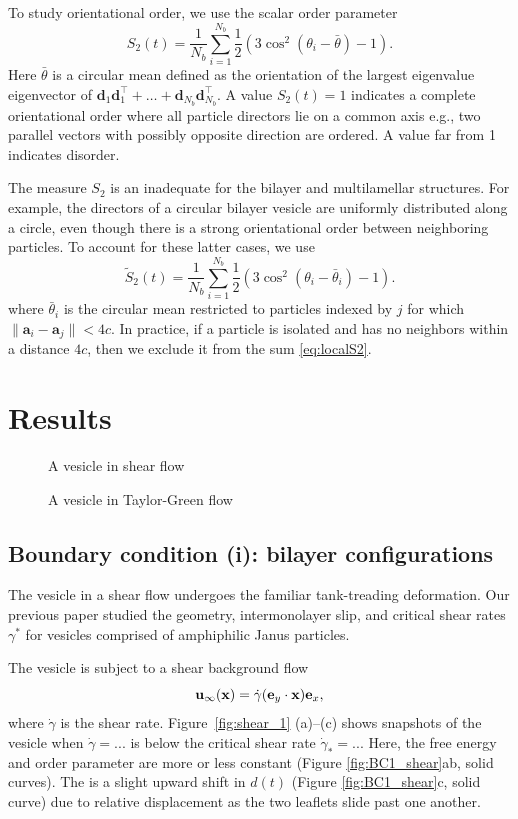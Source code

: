 \documentclass[aps,prl,preprint,groupedaddress]{revtex4-2}
\renewcommand{\aa}{\mathbf{a}}
\newcommand{\dd}{\mathbf{d}}
\newcommand{\xx}{\mathbf{x}}
\newcommand{\uu}{\mathbf{u}}
\begin{document}
To study orientational order, we use the scalar order parameter 
\begin{equation}
  \label{eq:S2}
S_2(t) = \frac{1}{N_b} \sum_{i=1}^{N_b} \frac{1}{2}(3\cos^2(\theta_i - \bar \theta) - 1).
\end{equation}
Here $\bar \theta$ is a circular mean defined as the
orientation of the largest eigenvalue eigenvector of 
$\dd_1\dd_1^\top + \dots + \dd_{N_b}\dd_{N_b}^\top$.
A value $S_2(t) = 1$ indicates a complete orientational
order where all particle directors lie on a common axis e.g.,
two parallel vectors with possibly opposite direction are ordered. 
A value far from 1 indicates disorder.

The measure $S_2$ is an inadequate for the bilayer and
multilamellar structures.  For example, the directors of a circular
bilayer vesicle are uniformly distributed along a circle, even though
there is a strong orientational order between neighboring particles.
To account for these latter cases, we use
\begin{equation}
  \label{eq:localS2}
\tilde{S}_2(t) = \frac{1}{N_b} \sum_{i=1}^{N_b}
\frac{1}{2}(3\cos^2(\theta_i - \bar \theta_i) - 1).
\end{equation}
where $\bar \theta_i$ is the circular mean restricted to particles
indexed by $j$ for which $\|\aa_i - \aa_j\| < 4c$. In practice, if a particle is
isolated and has no neighbors within a distance $4c$, then we exclude it from
the sum \eqref{eq:localS2}. 

\section{Results}
\label{sec:results}
\begin{figure}
\caption{\label{fig:ves_shear} A vesicle in shear flow}
\end{figure}
\begin{figure}
\caption{\label{fig:ves_shear} A vesicle in Taylor-Green flow}
\end{figure}
\subsection{Boundary condition (i):   bilayer configurations}
The vesicle in a shear flow undergoes the familiar tank-treading deformation.
Our previous paper \cite{Fu2022_JFM} studied the geometry,
intermonolayer slip, and critical shear rates $\gamma^*$
for vesicles comprised of amphiphilic Janus particles. 

The vesicle is subject to a shear background flow
\begin{equation}
\uu_\infty(\xx) = \dot\gamma ({\bf e}_y\cdot\xx){\bf e}_x,
\end{equation}
%
where $\dot\gamma$ is the shear rate. Figure~\ref{fig:shear_1} (a)--(c)
shows snapshots of the vesicle when $\dot\gamma= ... $ is
below the critical shear rate $\dot \gamma_* = ...$
Here, the free energy and order parameter are more or less constant
(Figure \ref{fig:BC1_shear}ab, solid curves).  The is a slight upward shift
in $d(t)$ (Figure \ref{fig:BC1_shear}c, solid curve) due to relative
displacement as the two leaflets slide past one another.  
\end{document}
